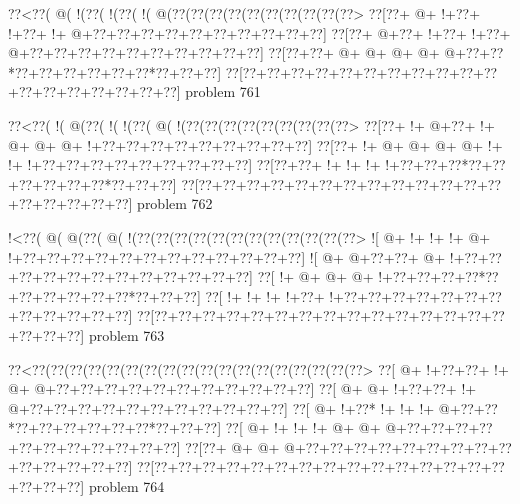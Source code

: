 \vbox{\vbox{\goo
\0??<\0??(\- @(\- !(\0??(\- !(\0??(\- !(\- @(\0??(\0??(\0??(\0??(\0??(\0??(\0??(\0??(\0??(\0??>
\0??[\0??+\- @+\- !+\0??+\- !+\0??+\- !+\- @+\0??+\0??+\0??+\0??+\0??+\0??+\0??+\0??+\0??+\0??]
\0??[\0??+\- @+\0??+\- !+\0??+\- !+\0??+\- @+\0??+\0??+\0??+\0??+\0??+\0??+\0??+\0??+\0??+\0??]
\0??[\0??+\0??+\- @+\- @+\- @+\- @+\- @+\0??+\0??*\0??+\0??+\0??+\0??+\0??+\0??*\0??+\0??+\0??]
\0??[\0??+\0??+\0??+\0??+\0??+\0??+\0??+\0??+\0??+\0??+\0??+\0??+\0??+\0??+\0??+\0??+\0??+\0??]
}
\hfil problem 761\hfil\break
}



\vbox{\vbox{\goo
\0??<\0??(\- !(\- @(\0??(\- !(\- !(\0??(\- @(\- !(\0??(\0??(\0??(\0??(\0??(\0??(\0??(\0??(\0??>
\0??[\0??+\- !+\- @+\0??+\- !+\- @+\- @+\- @+\- !+\0??+\0??+\0??+\0??+\0??+\0??+\0??+\0??+\0??]
\0??[\0??+\- !+\- @+\- @+\- @+\- @+\- !+\- !+\- !+\0??+\0??+\0??+\0??+\0??+\0??+\0??+\0??+\0??]
\0??[\0??+\0??+\- !+\- !+\- !+\- !+\0??+\0??+\0??*\0??+\0??+\0??+\0??+\0??+\0??*\0??+\0??+\0??]
\0??[\0??+\0??+\0??+\0??+\0??+\0??+\0??+\0??+\0??+\0??+\0??+\0??+\0??+\0??+\0??+\0??+\0??+\0??]
}
\hfil problem 762\hfil\break
}



\vbox{\vbox{\goo
\- !<\0??(\- @(\- @(\0??(\- @(\- !(\0??(\0??(\0??(\0??(\0??(\0??(\0??(\0??(\0??(\0??(\0??(\0??>
\- ![\- @+\- !+\- !+\- !+\- @+\- !+\0??+\0??+\0??+\0??+\0??+\0??+\0??+\0??+\0??+\0??+\0??+\0??]
\- ![\- @+\- @+\0??+\0??+\- @+\- !+\0??+\0??+\0??+\0??+\0??+\0??+\0??+\0??+\0??+\0??+\0??+\0??]
\0??[\- !+\- @+\- @+\- @+\- !+\0??+\0??+\0??+\0??*\0??+\0??+\0??+\0??+\0??+\0??*\0??+\0??+\0??]
\0??[\- !+\- !+\- !+\- !+\0??+\- !+\0??+\0??+\0??+\0??+\0??+\0??+\0??+\0??+\0??+\0??+\0??+\0??]
\0??[\0??+\0??+\0??+\0??+\0??+\0??+\0??+\0??+\0??+\0??+\0??+\0??+\0??+\0??+\0??+\0??+\0??+\0??]
}
\hfil problem 763\hfil\break
}



\vbox{\vbox{\goo
\0??<\0??(\0??(\0??(\0??(\0??(\0??(\0??(\0??(\0??(\0??(\0??(\0??(\0??(\0??(\0??(\0??(\0??(\0??>
\0??[\- @+\- !+\0??+\0??+\- !+\- @+\- @+\0??+\0??+\0??+\0??+\0??+\0??+\0??+\0??+\0??+\0??+\0??]
\0??[\- @+\- @+\- !+\0??+\0??+\- !+\- @+\0??+\0??+\0??+\0??+\0??+\0??+\0??+\0??+\0??+\0??+\0??]
\0??[\- @+\- !+\0??*\- !+\- !+\- !+\- @+\0??+\0??*\0??+\0??+\0??+\0??+\0??+\0??*\0??+\0??+\0??]
\0??[\- @+\- !+\- !+\- !+\- @+\- @+\- @+\0??+\0??+\0??+\0??+\0??+\0??+\0??+\0??+\0??+\0??+\0??]
\0??[\0??+\- @+\- @+\- @+\0??+\0??+\0??+\0??+\0??+\0??+\0??+\0??+\0??+\0??+\0??+\0??+\0??+\0??]
\0??[\0??+\0??+\0??+\0??+\0??+\0??+\0??+\0??+\0??+\0??+\0??+\0??+\0??+\0??+\0??+\0??+\0??+\0??]
}
\hfil problem 764\hfil\break
}



